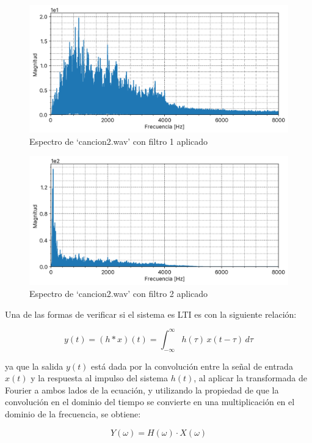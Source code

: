 \documentclass[12pt]{article}
\begin{document}
\begin{figure}[H]
\centering
\includegraphics{plot/cancion2_filter1_output_fft.png}
\caption{Espectro de `cancion2.wav' con filtro 1 aplicado}
\label{cancion2_filter1_output_fft}
\end{figure}

\begin{figure}[H]
\centering
\includegraphics{plot/cancion2_filter2_output_fft.png}
\caption{Espectro de `cancion2.wav' con filtro 2 aplicado}
\label{cancion2_filter2_output_fft}
\end{figure}

Una de las formas de verificar si el sistema es LTI es con la siguiente relación:

\[
y(t) = (h * x)(t) = \int_{-\infty}^{\infty} h(\tau)\, x(t - \tau)\, d\tau
\]

ya que la salida $y(t)$ está dada por la convolución entre la señal de entrada $x(t)$ y la respuesta al impulso del sistema $h(t)$, al aplicar la transformada de Fourier a ambos lados de la ecuación, y utilizando la propiedad de que la convolución en el dominio del tiempo se convierte en una multiplicación en el dominio de la frecuencia, se obtiene:

\[
Y(\omega) = H(\omega) \cdot X(\omega)
\]
\end{document}
